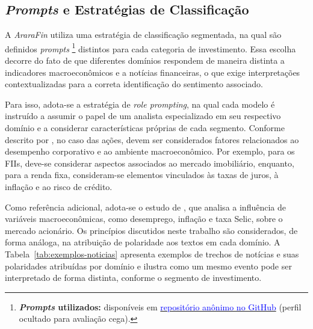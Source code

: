 \documentclass[12pt]{article}
\begin{document}
\subsection{\textit{Prompts} e Estratégias de Classificação}



A \textit{AraraFin} utiliza uma estratégia de classificação 
segmentada, na qual são definidos \textit{prompts}%
\footnote{\textbf{\textit{Prompts} utilizados:} disponíveis em
\href{https://github.com/pesquisador-anonimo/ararafin-research/blob/master/prompts.md}
{\textcolor{blue}{repositório anônimo no GitHub}} (perfil ocultado 
para avaliação cega).} distintos para cada categoria de investimento. Essa escolha 
decorre do fato de que diferentes domínios respondem de maneira 
distinta a indicadores macroeconômicos e a notícias financeiras, 
o que exige interpretações contextualizadas para a correta 
identificação do sentimento associado.

Para isso, adota-se a estratégia de \textit{role prompting}, na qual cada modelo é instruído a assumir o papel de um analista especializado em seu respectivo domínio e a considerar características próprias de cada segmento. Conforme descrito por \cite{b3_2025}, no caso das ações, devem ser considerados fatores relacionados ao desempenho corporativo e ao ambiente macroeconômico. Por exemplo, para os FIIs, deve-se considerar aspectos associados ao mercado imobiliário, enquanto, para a renda fixa, consideram-se elementos vinculados às taxas de juros, à inflação e ao risco de crédito. 

Como referência adicional, adota-se o estudo de \cite{andrade2022influencia}, que analisa a influência de variáveis macroeconômicas, como desemprego, inflação e taxa Selic, sobre o mercado acionário. Os princípios discutidos neste trabalho são considerados, de forma análoga, na atribuição de polaridade aos textos em cada domínio.
A Tabela~\ref{tab:exemplos-noticias} apresenta exemplos de trechos de notícias e suas polaridades atribuídas por domínio e ilustra como um mesmo evento pode ser interpretado de forma distinta, conforme o segmento de investimento.
\end{document}
